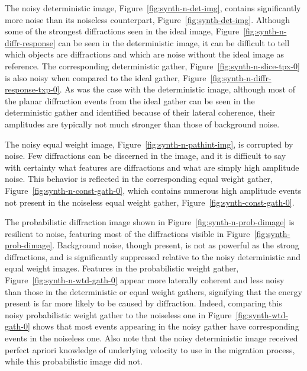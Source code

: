 The noisy deterministic image, Figure~\ref{fig:synth-n-det-img}, contains significantly more noise than its noiseless counterpart, Figure~\ref{fig:synth-det-img}.  Although some of the strongest diffractions seen in the ideal image, Figure~\ref{fig:synth-n-diffr-response} can be seen in the deterministic image, it can be difficult to tell which objects are diffractions and which are noise without the ideal image as reference.  The corresponding deterministic gather, Figure~\ref{fig:synth-n-slice-tpx-0}  is also noisy when compared to the ideal gather, Figure~\ref{fig:synth-n-diffr-response-txp-0}.  As was the case with the deterministic image, although most of the planar diffraction events from the ideal gather can be seen in the deterministic gather and identified because of their lateral coherence, their amplitudes are typically not much stronger than those of background noise.  

The noisy equal weight image, Figure~\ref{fig:synth-n-pathint-img}, is corrupted by noise.  Few diffractions can be discerned in the image, and it is difficult to say with certainty what features are diffractions and what are simply high amplitude noise.  This behavior is reflected in the corresponding equal weight gather, Figure~\ref{fig:synth-n-const-gath-0}, which contains numerous high amplitude events not present in the noiseless equal weight gather, Figure~\ref{fig:synth-const-gath-0}.

The probabilistic diffraction image shown in Figure~\ref{fig:synth-n-prob-dimage} is resilient to noise, featuring most of the diffractions visible in Figure~\ref{fig:synth-prob-dimage}. Background noise, though present, is not as powerful as the strong diffractions, and is significantly suppressed relative to the noisy deterministic and equal weight images.  Features in the probabilistic weight gather, Figure~\ref{fig:synth-n-wtd-gath-0} appear more laterally coherent and less noisy than those in the deterministic or equal weight gathers, signifying that the energy present is far more likely to be caused by diffraction.  Indeed, comparing this noisy probabilistic weight gather to the noiseless one in Figure~\ref{fig:synth-wtd-gath-0} shows that most events appearing in the noisy gather have corresponding events in the noiseless one.  Also note that the noisy deterministic image received perfect apriori knowledge of underlying velocity to use in the migration process, while this probabilistic image did not.





